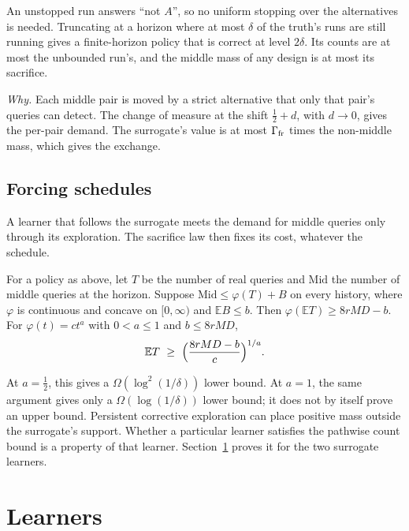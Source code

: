 An unstopped run answers ``not $A$'', so no uniform stopping over the alternatives is needed.
Truncating at a horizon where at most $\delta$ of the truth's runs are still running gives a
finite-horizon policy that is correct at level $2\delta$. Its counts are at most the unbounded
run's, and the middle mass of any design is at most its sacrifice.

\emph{Why.} Each middle pair is moved by a strict alternative that only that pair's queries can
detect. The change of measure at the shift $\frac12+d$, with $d\to0$, gives the per-pair demand.
The surrogate's value is at most $\Gamma_{\rm fr}$ times the non-middle mass, which gives the
exchange.

\subsection{Forcing schedules}

A learner that follows the surrogate meets the demand for middle queries only through its
exploration. The sacrifice law then fixes its cost, whatever the schedule.

\begin{theorem}
\label{thm:forcing}
For a policy as above, let $T$ be the number of real queries and $\mathrm{Mid}$ the number of
middle queries at the horizon. Suppose $\mathrm{Mid}\le\varphi(T)+B$ on every history, where
$\varphi$ is continuous and concave on $[0,\infty)$ and $\mathbb{E}B\le b$. Then
$\varphi(\mathbb{E}T)\ge8rMD-b$. For $\varphi(t)=ct^{a}$ with $0<a\le1$ and
$b\le 8rMD$,
\[
\mathbb{E}T\ \ge\ \Bigl(\frac{8rMD-b}{c}\Bigr)^{1/a}.
\]
\end{theorem}


At $a=\frac12$, this gives a $\Omega(\log^{2}(1/\delta))$ lower bound. At $a=1$, the
same argument gives only a $\Omega(\log(1/\delta))$ lower bound; it does not by itself
prove an upper bound. Persistent corrective exploration can place positive mass outside the
surrogate's support. Whether a particular learner satisfies the pathwise count bound is a
property of that learner. Section~\ref{sec:learners} proves it for the two surrogate learners.

\section{Learners}
\label{sec:learners}

